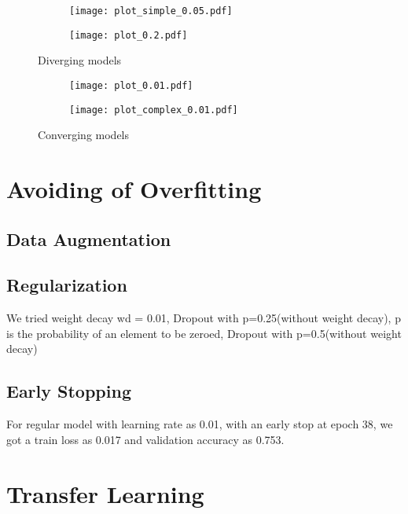 \documentclass[sigconf,nonacm]{acmart}
\begin{document}
\begin{figure}[ht]
\begin{subfigure}[c]{0.45\columnwidth}
\texttt{[image: plot\_simple\_0.05.pdf]}
\end{subfigure}
\begin{subfigure}[c]{0.45\columnwidth}
\texttt{[image: plot\_0.2.pdf]}
\end{subfigure}
\caption{Diverging models}
\label{part2:diverging}
\end{figure}

\begin{figure}[ht]
\begin{subfigure}[c]{0.45\columnwidth}
\texttt{[image: plot\_0.01.pdf]}
\end{subfigure}
\begin{subfigure}[c]{0.45\columnwidth}
\texttt{[image: plot\_complex\_0.01.pdf]}
\end{subfigure}
\caption{Converging models}
\label{part2:converging}
\end{figure}

\section{Avoiding of Overfitting}

\subsection{Data Augmentation}

\subsection{Regularization}
We tried weight decay wd = 0.01,
Dropout with p=0.25(without weight decay), p is the probability of an element to be zeroed,
Dropout with p=0.5(without weight decay)

\subsection{Early Stopping}
For regular model with learning rate as 0.01, with an early stop at epoch 38, we got a train loss as 0.017 and validation accuracy as 0.753.
\section{Transfer Learning}



\end{document}

